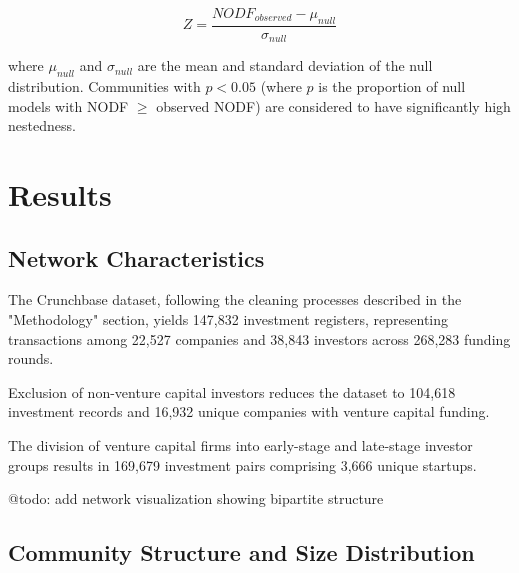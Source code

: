 \documentclass[12pt]{article}
\begin{document}
\begin{equation}
Z = \frac{NODF_{observed} - \mu_{null}}{\sigma_{null}}
\end{equation}

where $\mu_{null}$ and $\sigma_{null}$ are the mean and standard deviation of the null distribution. Communities with $p < 0.05$ (where $p$ is the proportion of null models with NODF $\geq$ observed NODF) are considered to have significantly high nestedness.

\section{Results}

\subsection{Network Characteristics}

\newcommand{\numCompanies}{22,527}
\newcommand{\numInvestors}{38,843}
\newcommand{\numInvestments}{147,832}
\newcommand{\numFundingRounds}{268,283}

The Crunchbase dataset, following the cleaning processes described in the "Methodology" section, yields \numInvestments{} investment registers, representing transactions among \numCompanies{} companies and \numInvestors{} investors across \numFundingRounds{} funding rounds.

\newcommand{\numVCInvestments}{104,618}
\newcommand{\numCompaniesWithVCFund}{16,932}

Exclusion of non-venture capital investors reduces the dataset to \numVCInvestments{} investment records and \numCompaniesWithVCFund{} unique companies with venture capital funding.

\newcommand{\invPairs}{169,679}
\newcommand{\invPairsUniqueStartups}{3,666}

The division of venture capital firms into early-stage and late-stage investor groups results in \invPairs{} investment pairs comprising \invPairsUniqueStartups{} unique startups.

@todo: add network visualization showing bipartite structure

\newcommand{\numCommunities}{175}
\newcommand{\numTopCommunities}{5}
\newcommand{\numCommunitiesThreshold}{150}

\subsection{Community Structure and Size Distribution}
\end{document}
